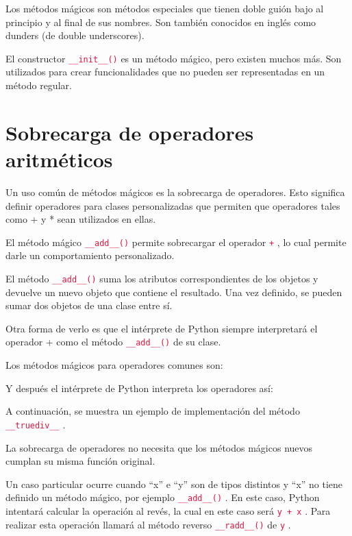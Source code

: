\documentclass{report}
\newcommand{\doble}[1]{``#1''}
\newcommand{\ttt}[1]{
  \textcolor{Crimson}{\texttt{#1}}
}
\begin{document}
Los métodos mágicos son métodos especiales que tienen doble guión bajo al principio y al final de sus nombres. Son también conocidos en inglés como dunders (de double underscores).\smallskip

El constructor \ttt{\_\_init\_\_()} es un método mágico, pero existen muchos más. Son utilizados para crear funcionalidades que no pueden ser representadas en un método regular.

\section{Sobrecarga de operadores aritméticos}

Un uso común de métodos mágicos es la sobrecarga de operadores. Esto significa definir operadores para clases personalizadas que permiten que operadores tales como + y * sean utilizados en ellas.\smallskip

El método mágico \ttt{\_\_add\_\_()} permite sobrecargar el operador \ttt{+}, lo cual permite darle un comportamiento personalizado.


El método \ttt{\_\_add\_\_()} suma los atributos correspondientes de los objetos y devuelve un nuevo objeto que contiene el resultado. Una vez definido, se pueden sumar dos objetos de una clase entre sí.\smallskip

Otra forma de verlo es que el intérprete de Python siempre interpretará el operador + como el método \ttt{\_\_add\_\_()} de su clase.\smallskip

Los métodos mágicos para operadores comunes son:


Y después el intérprete de Python interpreta los operadores así:


A continuación, se muestra un ejemplo de implementación del método \ttt{\_\_truediv\_\_}.


La sobrecarga de operadores no necesita que los métodos mágicos nuevos cumplan su misma función original.\smallskip

Un caso particular ocurre cuando \doble{x} e \doble{y} son de tipos distintos y \doble{x} no tiene definido un método mágico, por ejemplo \ttt{\_\_add\_\_()}. En este caso, Python intentará calcular la operación al revés, la cual en este caso será \ttt{y + x}. Para realizar esta operación llamará al método reverso \ttt{\_\_radd\_\_()} de \ttt{y}.\smallskip
\end{document}
